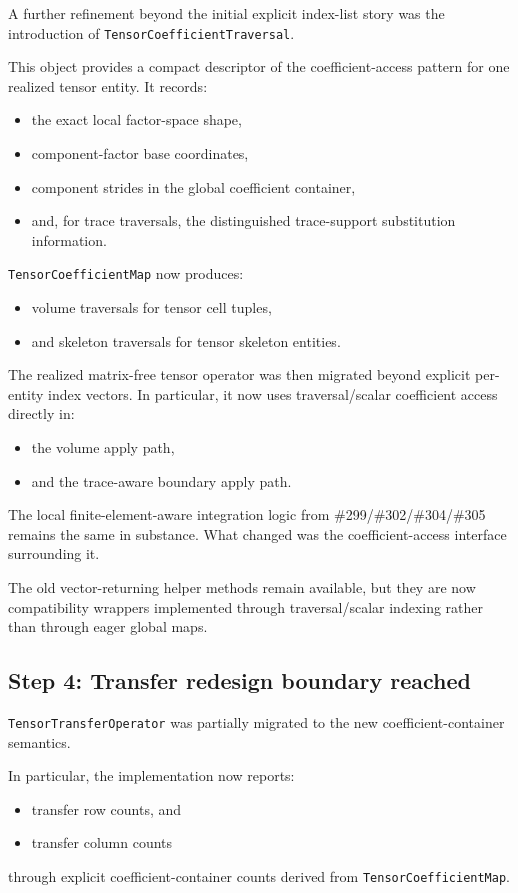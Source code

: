 \documentclass[11pt]{article}
\begin{document}
A further refinement beyond the initial explicit index-list story was the introduction of \texttt{TensorCoefficientTraversal}.

This object provides a compact descriptor of the coefficient-access pattern for one realized tensor entity.  It records:
\begin{itemize}[leftmargin=2em]
\item the exact local factor-space shape,
\item component-factor base coordinates,
\item component strides in the global coefficient container,
\item and, for trace traversals, the distinguished trace-support substitution information.
\end{itemize}

\texttt{TensorCoefficientMap} now produces:
\begin{itemize}[leftmargin=2em]
\item volume traversals for tensor cell tuples,
\item and skeleton traversals for tensor skeleton entities.
\end{itemize}

The realized matrix-free tensor operator was then migrated beyond explicit per-entity index vectors.  In particular, it now uses traversal/scalar coefficient access directly in:
\begin{itemize}[leftmargin=2em]
\item the volume apply path,
\item and the trace-aware boundary apply path.
\end{itemize}

The local finite-element-aware integration logic from \#299/\#302/\#304/\#305 remains the same in substance.  What changed was the coefficient-access interface surrounding it.

The old vector-returning helper methods remain available, but they are now compatibility wrappers implemented through traversal/scalar indexing rather than through eager global maps.

\subsection{Step 4: Transfer redesign boundary reached}

\texttt{TensorTransferOperator} was partially migrated to the new coefficient-container semantics.

In particular, the implementation now reports:
\begin{itemize}[leftmargin=2em]
\item transfer row counts, and
\item transfer column counts
\end{itemize}
through explicit coefficient-container counts derived from \texttt{TensorCoefficientMap}.
\end{document}
